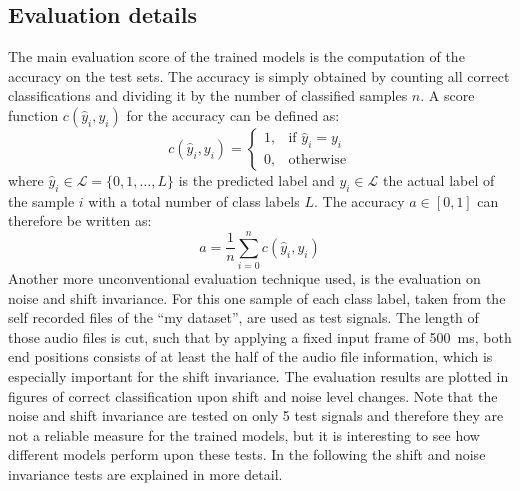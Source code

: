 
\subsection{Evaluation details}\label{sec:exp_details_tb}
The main evaluation score of the trained models is the computation of the accuracy on the test sets.
The accuracy is simply obtained by counting all correct classifications and dividing it by the number of classified samples $n$.
A score function $c(\hat{y}_i, y_i)$ for the accuracy can be defined as:
\begin{equation}
  c(\hat{y}_i, y_i) = 
  \begin{cases}
    1, & \text{if } \hat{y}_i = y_i\\
    0, & \text{otherwise} 
  \end{cases}
\end{equation}
where $\hat{y}_i \in \mathcal{L} = \{0, 1, \dots, L\} $ is the predicted label and $y_i \in \mathcal{L}$ the actual label of the sample $i$ with a total number of class labels $L$.
The accuracy $a \in [0, 1]$ can therefore be written as:
\begin{equation}
  a = \frac{1}{n} \sum_{i=0}^n c(\hat{y}_i, y_i)
\end{equation}
Another more unconventional evaluation technique used, is the evaluation on noise and shift invariance.
For this one sample of each class label, taken from the self recorded files of the \enquote{my dataset}, are used as test signals.
The length of those audio files is cut, such that by applying a fixed input frame of \SI{500}{\milli\second}, both end positions consists of at least the half of the audio file information, which is especially important for the shift invariance.
The evaluation results are plotted in figures of correct classification upon shift and noise level changes.
Note that the noise and shift invariance are tested on only 5 test signals and therefore they are not a reliable measure for the trained models, but it is interesting to see how different models perform upon these tests.
In the following the shift and noise invariance tests are explained in more detail.



